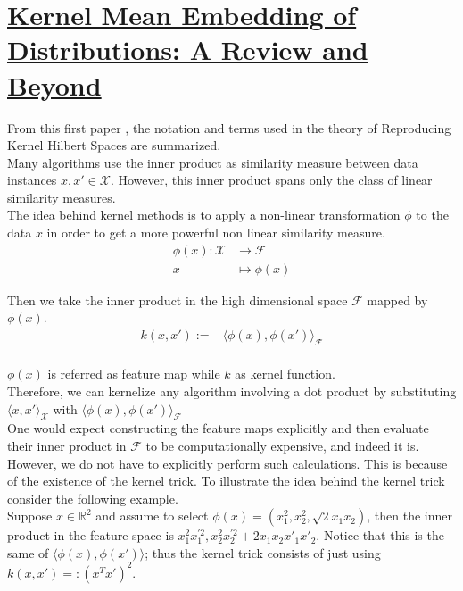 
\section{\href{https://arxiv.org/abs/1605.09522}{Kernel Mean Embedding of Distributions: A Review and Beyond}}
From this first paper \cite{Muandet_2017}, the notation and terms used in the theory of Reproducing Kernel Hilbert Spaces are summarized.
\\
Many algorithms use the inner product as similarity measure between data instances $x, x' \in \mathcal{X}$. However, this inner product spans only the class of linear similarity measures. 
\\
The idea behind kernel methods is to apply a non-linear transformation $\phi$ to the data $x$ 
in order to get a more powerful non linear similarity measure.
\begin{align*}
\phi(x):\mathcal{X} &\longrightarrow \mathcal{F}
    \\
    x&\mapsto \phi(x)
\end{align*}


Then we take the inner product in the high dimensional space $\mathcal{F}$ mapped by $\phi(x)$.
\\
\begin{align*}
k(x,x'):=&\langle \phi(x), \phi(x') \rangle_{\mathcal{F}}
\end{align*}
\\
$\phi(x)$ is referred as feature map while $k$ as kernel function.
\\
Therefore, we can kernelize any algorithm involving a dot product by substituting $\langle x, x' \rangle_{\mathcal{X}}$ with $\langle \phi(x), \phi(x') \rangle_{\mathcal{F}}$
\\
One would expect constructing the feature maps explicitly and then evaluate their inner product in $\mathcal{F}$ to be computationally expensive, and indeed it is. However, we do not have to explicitly perform such calculations. This is because of the existence of the kernel trick.
To illustrate the idea behind the kernel trick consider the following example. 
\\
Suppose $x \in \mathbb{R}^2$ and assume to select $\phi(x)=(x_{1}^{2},x_{2}^{2},\sqrt{2}x_{1}x_{2})$, then the inner product in the feature space is $x_{1}^{2}x_{1}^{'2},x_{2}^{2}x_{2}^{'2}+2x_{1}x_{2}x'_{1}x'_{2}$.
Notice that this is the same of $\langle \phi(x), \phi(x') \rangle$; thus the kernel trick consists of just using $k(x,x')=:(x^Tx')^2$.



